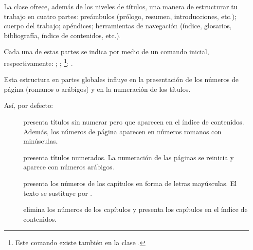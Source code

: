 La clase  ofrece, además de los niveles de títulos, una manera de estructurar tu trabajo en cuatro partes: preámbulos (prólogo, resumen, introducciones, etc.); cuerpo del trabajo; apéndices; herramientas de navegación (índice, glosarios, bibliografía, índice de contenidos, etc.). 

Cada una de estas partes se indica por medio de un comando inicial, respectivamente: ; ; \footnote{Este comando existe también en la clase .}; .

Esta estructura en partes globales influye en la presentación de los números de página (romanos o arábigos) y en la numeración de los títulos.

Así, por defecto: \begin{description}
\item[] presenta títulos sin numerar pero que aparecen en el índice de contenidos. Además, los números de página aparecen en números romanos con minúsculas. 
\item[] presenta títulos numerados. La numeración de las páginas se reinicia y aparece con números arábigos.
\item[] presenta los números de los capítulos en forma de letras mayúsculas. El texto  se sustituye por .
\item[] elimina los números de los capítulos y presenta los capítulos en el índice de contenidos.
\end{description}

